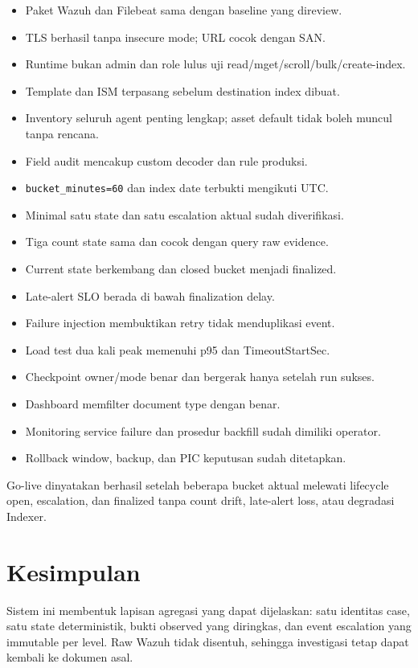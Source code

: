 \documentclass[11pt,a4paper,oneside]{report}
\DeclareRobustCommand{\code}[1]{\nolinkurl{#1}}
\begin{document}
\begin{itemize}[label=$\square$]
  \item Paket Wazuh dan Filebeat sama dengan baseline yang direview.
  \item TLS berhasil tanpa insecure mode; URL cocok dengan SAN.
  \item Runtime bukan admin dan role lulus uji read/mget/scroll/bulk/create-index.
  \item Template dan ISM terpasang sebelum destination index dibuat.
  \item Inventory seluruh agent penting lengkap; asset default tidak boleh muncul tanpa rencana.
  \item Field audit mencakup custom decoder dan rule produksi.
  \item \code{bucket\_minutes=60} dan index date terbukti mengikuti UTC.
  \item Minimal satu state dan satu escalation aktual sudah diverifikasi.
  \item Tiga count state sama dan cocok dengan query raw evidence.
  \item Current state berkembang dan closed bucket menjadi finalized.
  \item Late-alert SLO berada di bawah finalization delay.
  \item Failure injection membuktikan retry tidak menduplikasi event.
  \item Load test dua kali peak memenuhi p95 dan TimeoutStartSec.
  \item Checkpoint owner/mode benar dan bergerak hanya setelah run sukses.
  \item Dashboard memfilter document type dengan benar.
  \item Monitoring service failure dan prosedur backfill sudah dimiliki operator.
  \item Rollback window, backup, dan PIC keputusan sudah ditetapkan.
\end{itemize}

Go-live dinyatakan berhasil setelah beberapa bucket aktual melewati lifecycle open,
escalation, dan finalized tanpa count drift, late-alert loss, atau degradasi Indexer.

\chapter{Kesimpulan}

Sistem ini membentuk lapisan agregasi yang dapat dijelaskan: satu identitas case,
satu state deterministik, bukti observed yang diringkas, dan event escalation yang
immutable per level. Raw Wazuh tidak disentuh, sehingga investigasi tetap dapat
kembali ke dokumen asal.
\end{document}
